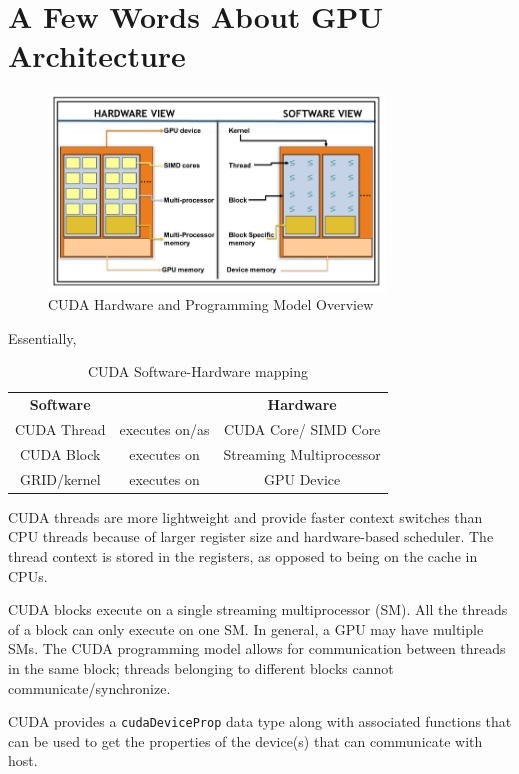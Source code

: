 \section*{A Few Words About GPU Architecture}
\begin{figure}[h]
    \centering
    \includegraphics[width=0.8\textwidth]{figures/architecture.png}
    \caption{CUDA Hardware and Programming Model Overview}
    \label{fig:figures-architecture-png}
\end{figure}

Essentially,
\begin{table}[h]
    \centering
    \caption{CUDA Software-Hardware mapping}
    \label{tab:mapping}
    \begin{tabular}{c | c | c}
    \textbf{Software} &  & \textbf{Hardware} \\
    CUDA Thread & executes on/as & CUDA Core/ SIMD Core\\
    CUDA Block & executes on & Streaming Multiprocessor \\
    GRID/kernel & executes on & GPU Device
    \end{tabular}
\end{table}

CUDA threads are more lightweight and provide faster context switches
than CPU threads because of larger register size and hardware-based
scheduler. The thread context is stored in the registers, as opposed
to being on the cache in CPUs.

CUDA blocks execute on a single streaming multiprocessor (SM). All
the threads of a block can only execute on one SM. In general, a GPU
may have multiple SMs. The CUDA programming model allows for
communication between threads in the same block; threads belonging
to different blocks cannot communicate/synchronize.

CUDA provides a \texttt{cudaDeviceProp} data type along with
associated functions that can be used to get the properties of the
device(s) that can communicate with host.

